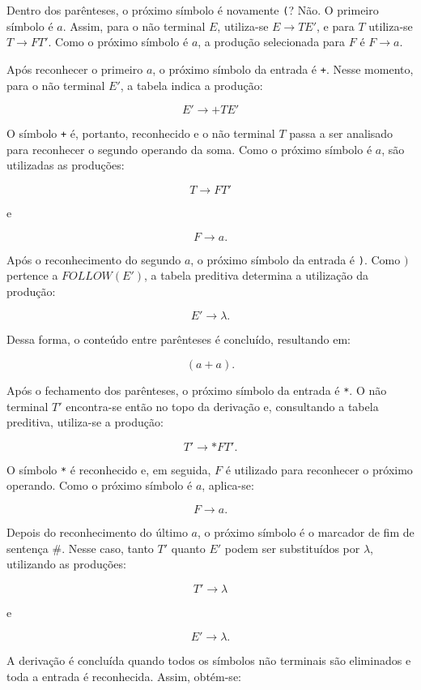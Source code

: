 \documentclass[
  brazilian,
  letterpaper,
]{book}
\theoremstyle{plain}
\theoremstyle{definition}
\theoremstyle{remark}
\begin{document}
Dentro dos parênteses, o próximo símbolo é novamente \texttt{(}? Não. O
primeiro símbolo é \(a\). Assim, para o não terminal \(E\), utiliza-se
\(E\rightarrow TE'\), e para \(T\) utiliza-se \(T\rightarrow FT'\). Como
o próximo símbolo é \(a\), a produção selecionada para \(F\) é
\(F\rightarrow a\).

Após reconhecer o primeiro \(a\), o próximo símbolo da entrada é
\texttt{+}. Nesse momento, para o não terminal \(E'\), a tabela indica a
produção:

\[
E'\rightarrow +TE'
\]

O símbolo \texttt{+} é, portanto, reconhecido e o não terminal \(T\)
passa a ser analisado para reconhecer o segundo operando da soma. Como o
próximo símbolo é \(a\), são utilizadas as produções:

\[
T\rightarrow FT'
\]

e

\[
F\rightarrow a.
\]

Após o reconhecimento do segundo \(a\), o próximo símbolo da entrada é
\texttt{)}. Como \()\) pertence a \(FOLLOW(E')\), a tabela preditiva
determina a utilização da produção:

\[
E'\rightarrow\lambda.
\]

Dessa forma, o conteúdo entre parênteses é concluído, resultando em:

\[
(a+a).
\]

Após o fechamento dos parênteses, o próximo símbolo da entrada é
\texttt{*}. O não terminal \(T'\) encontra-se então no topo da derivação
e, consultando a tabela preditiva, utiliza-se a produção:

\[
T'\rightarrow *FT'.
\]

O símbolo \texttt{*} é reconhecido e, em seguida, \(F\) é utilizado para
reconhecer o próximo operando. Como o próximo símbolo é \(a\),
aplica-se:

\[
F\rightarrow a.
\]

Depois do reconhecimento do último \(a\), o próximo símbolo é o marcador
de fim de sentença \(\#\). Nesse caso, tanto \(T'\) quanto \(E'\) podem
ser substituídos por \(\lambda\), utilizando as produções:

\[
T'\rightarrow\lambda
\]

e

\[
E'\rightarrow\lambda.
\]

A derivação é concluída quando todos os símbolos não terminais são
eliminados e toda a entrada é reconhecida. Assim, obtém-se:
\end{document}
